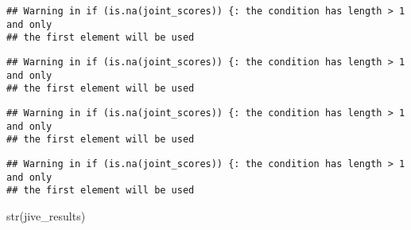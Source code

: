 \documentclass[
]{article}
\newenvironment{Shaded}{\begin{snugshade}}{\end{snugshade}}
\newcommand{\FunctionTok}[1]{\textcolor[rgb]{0.00,0.00,0.00}{#1}}
\newcommand{\NormalTok}[1]{#1}
\begin{document}
\begin{verbatim}
## Warning in if (is.na(joint_scores)) {: the condition has length > 1 and only
## the first element will be used
\end{verbatim}

\begin{verbatim}
## Warning in if (is.na(joint_scores)) {: the condition has length > 1 and only
## the first element will be used
\end{verbatim}

\begin{verbatim}
## Warning in if (is.na(joint_scores)) {: the condition has length > 1 and only
## the first element will be used
\end{verbatim}

\begin{verbatim}
## Warning in if (is.na(joint_scores)) {: the condition has length > 1 and only
## the first element will be used
\end{verbatim}

\begin{Shaded}
\begin{Highlighting}[]
\FunctionTok{str}\NormalTok{(jive\_results)}
\end{Highlighting}
\end{Shaded}
\end{document}
